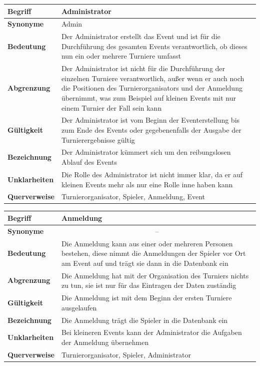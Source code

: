 \documentclass[11pt]{article}
\begin{document}
\begin{tabularx}{\textwidth}{| p{} | p{} |}
	\hline
	\textbf{Begriff} & Administrator\\
	\hline
	\textbf{Synonyme} & Admin\\
	\hline
	\textbf{Bedeutung} & Der Administrator erstellt das Event und ist für die Durchführung des gesamten Events verantwortlich, ob dieses nun ein oder mehrere Turniere umfasst\\
	\hline
	\textbf{Abgrenzung} & Der Administrator ist nicht für die Durchführung der einzelnen Turniere verantwortlich, außer wenn er auch noch die Positionen des Turnierorganisators und der Anmeldung übernimmt, was zum Beispiel auf kleinen Events mit nur einem Turnier der Fall sein kann\\
	\hline
	\textbf{Gültigkeit} & Der Administrator ist vom Beginn der Eventerstellung bis zum Ende des Events oder gegebenenfalls der Ausgabe der Turnierergebnisse gültig\\
	\hline
	\textbf{Bezeichnung} & Der Administrator kümmert sich um den reibungslosen Ablauf des Events\\
	\hline
	\textbf{Unklarheiten} & Die Rolle des Administrator ist nicht immer klar, da er auf kleinen Events mehr als nur eine Rolle inne haben kann\\
	\hline
	\textbf{Querverweise} &  Turnierorganisator, Spieler, Anmeldung, Event\\
	\hline
\end{tabularx}

\newpage

\begin{tabularx}{\textwidth}{| p{} | p{} |}
	\hline
	\textbf{Begriff} & Anmeldung\\
	\hline
	\textbf{Synonyme} & \multicolumn{1}{|c|}{--} \\
	\hline
	\textbf{Bedeutung} & Die Anmeldung kann aus einer oder mehreren Personen bestehen, diese nimmt die Anmeldungen der Spieler vor Ort am Event auf und trägt sie dann in die Datenbank ein\\
	\hline
	\textbf{Abgrenzung} & Die Anmeldung hat mit der Organisation des Turniers nichts zu tun, sie ist nur für das Eintragen der Daten zuständig\\
	\hline
	\textbf{Gültigkeit} & Die Anmeldung ist mit dem Beginn der ersten Turniere ausgelaufen\\
	\hline
	\textbf{Bezeichnung} & Die Anmeldung trägt die Spieler in die Datenbank ein\\
	\hline
	\textbf{Unklarheiten} & Bei kleineren Events kann der Administrator die Aufgaben der Anmeldung übernehmen \\
	\hline
	\textbf{Querverweise} &  Turnierorganisator, Spieler, Administrator\\
	\hline
\end{tabularx}
\end{document}

